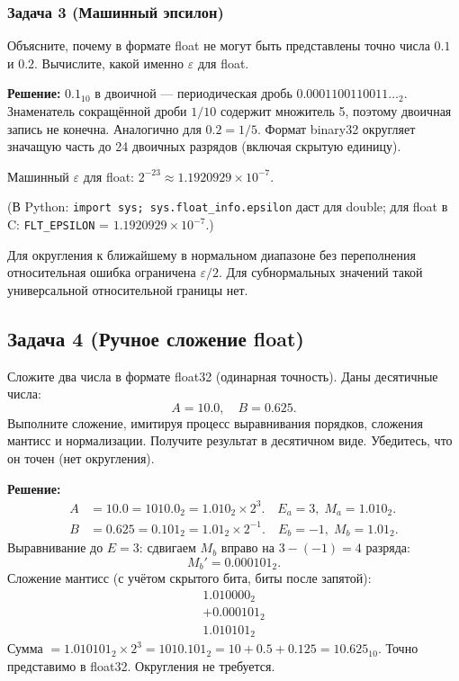 \subsubsection*{Задача 3 (Машинный эпсилон)}
Объясните, почему в формате float не могут быть представлены точно числа $0.1$ и $0.2$. Вычислите, какой именно $\varepsilon$ для float.

\textbf{Решение:}
$0.1_{10}$ в двоичной --- периодическая дробь $0.0001100110011\ldots_2$.
Знаменатель сокращённой дроби $1/10$ содержит множитель 5, поэтому
двоичная запись не конечна. Аналогично для $0.2=1/5$.
Формат binary32 округляет значащую часть до 24 двоичных разрядов
(включая скрытую единицу).

Машинный $\varepsilon$ для float: $2^{-23} \approx 1.1920929 \times 10^{-7}$.

(В Python: \texttt{import sys; sys.float\_info.epsilon} даст для double; для float в C: \texttt{FLT\_EPSILON} = $1.1920929\times10^{-7}$.)

Для округления к ближайшему в нормальном диапазоне без переполнения
относительная ошибка ограничена $\varepsilon/2$. Для субнормальных
значений такой универсальной относительной границы нет.

\subsection*{Задача 4 (Ручное сложение float)}
Сложите два числа в формате float32 (одинарная точность). Даны десятичные числа:
\[
A = 10.0,\quad B = 0.625.
\]
Выполните сложение, имитируя процесс выравнивания порядков, сложения мантисс и нормализации. Получите результат в десятичном виде. Убедитесь, что он точен (нет округления).

\textbf{Решение:}
\begin{align*}
A &= 10.0 = 1010.0_2 = 1.010_2 \times 2^3. \quad E_a = 3,\; M_a = 1.010_2.\\
B &= 0.625 = 0.101_2 = 1.01_2 \times 2^{-1}. \quad E_b = -1,\; M_b = 1.01_2.
\end{align*}
Выравнивание до $E=3$: сдвигаем $M_b$ вправо на $3-(-1)=4$ разряда:
\[
M_b' = 0.000101_2.
\]
Сложение мантисс (с учётом скрытого бита, биты после запятой):
\[
\begin{array}{r}
  1.010000_2 \\
+ 0.000101_2 \\
\hline
  1.010101_2
\end{array}
\]
Сумма $= 1.010101_2 \times 2^3 = 1010.101_2 = 10 + 0.5 + 0.125 = 10.625_{10}$.
Точно представимо в float32. Округления не требуется.

